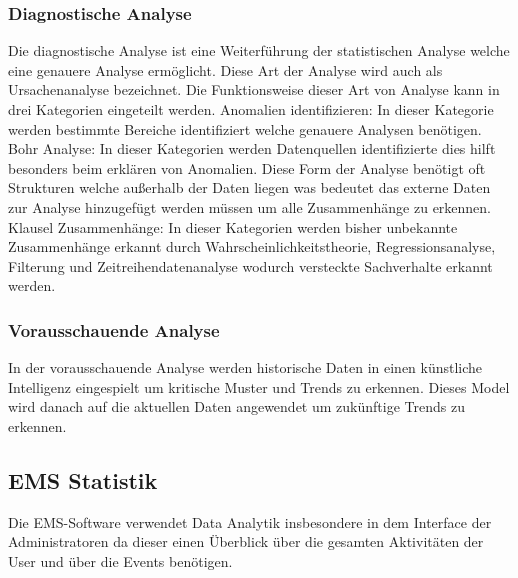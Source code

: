 			\subsubsection{Diagnostische Analyse}
				Die diagnostische Analyse ist eine Weiterführung der statistischen Analyse welche eine genauere Analyse ermöglicht. Diese Art der Analyse wird auch als Ursachenanalyse bezeichnet. Die Funktionsweise dieser Art von Analyse kann in drei Kategorien eingeteilt werden. \newline
				Anomalien identifizieren: In dieser Kategorie werden bestimmte Bereiche identifiziert welche genauere Analysen benötigen. \newline
				Bohr Analyse: In dieser Kategorien werden Datenquellen identifizierte dies hilft besonders beim erklären von Anomalien. Diese Form der Analyse benötigt oft Strukturen welche außerhalb der Daten liegen was bedeutet das externe Daten zur Analyse hinzugefügt werden müssen um alle Zusammenhänge zu erkennen.  \newline
				Klausel Zusammenhänge: In dieser Kategorien werden bisher unbekannte Zusammenhänge erkannt durch Wahrscheinlichkeitstheorie, Regressionsanalyse, Filterung und Zeitreihendatenanalyse wodurch versteckte Sachverhalte erkannt werden.  		
			
			\subsubsection{Vorausschauende Analyse}
				In der vorausschauende Analyse werden historische Daten in einen künstliche Intelligenz eingespielt um kritische Muster und Trends zu erkennen. Dieses Model wird danach auf die aktuellen Daten angewendet um zukünftige Trends zu erkennen. 
	
		\subsection{EMS Statistik}
			Die EMS-Software verwendet Data Analytik insbesondere in dem Interface der Administratoren da dieser einen Überblick über die gesamten Aktivitäten der User und über die Events benötigen.  
